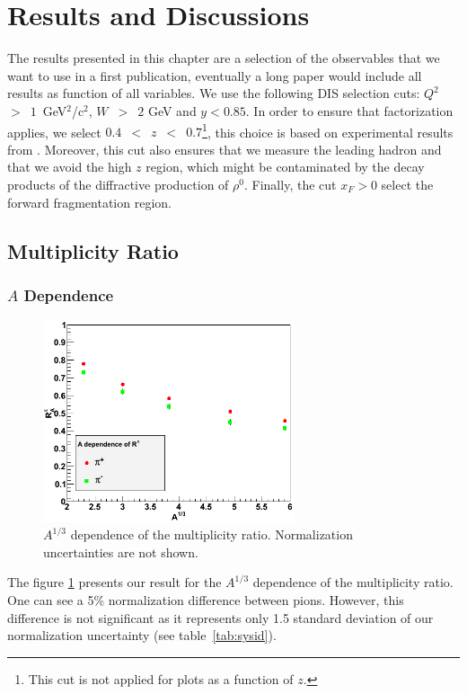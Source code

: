 \section{Results and Discussions}
\label{chap:results}

The results presented in this chapter are a selection of the observables 
that we want to use in a first publication, eventually a long paper would
include all results as function of all variables. We use the following DIS selection cuts: 
$Q^2$~$>$~$1$~GeV$^2$/c$^2$, $W$~$>$~$2$ GeV and $y<0.85$. In order to ensure that 
factorization applies, we select $0.4$~$<$~$z$~$<$~$0.7$\footnote{This cut is not 
applied for plots as a function of $z$.}, this choice is based on experimental results from 
\cite{Asaturyan:2011mq}. Moreover, this cut also ensures that we measure the leading 
hadron and that we avoid the high $z$ region, which might be contaminated by 
the decay products of the diffractive production of $\rho^0$. Finally, the cut 
$x_F > 0$ select the forward fragmentation region.

\subsection{Multiplicity Ratio}

\subsubsection{$A$ Dependence}
\label{sec:resA}

\begin{figure}[p]
\centering
\includegraphics[width=7.4cm] {chap6-fig/F_RvA.png} 
\caption {$A^{1/3}$ dependence of the multiplicity ratio. Normalization 
uncertainties are not shown.}
\label{fig:RA}
\end{figure}

The figure \ref{fig:RA} presents our result for the $A^{1/3}$ dependence of 
the multiplicity ratio. One can see a 5\% normalization difference between
pions. However, this difference is not significant as it represents only 1.5 
standard deviation of our normalization uncertainty (see table~\ref{tab:sysid}).

